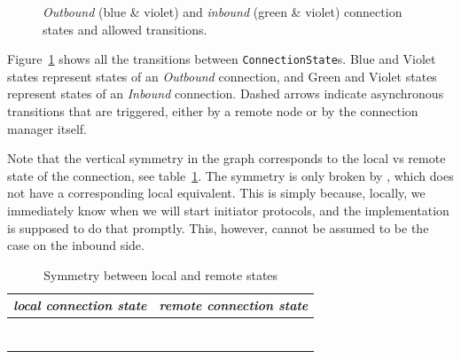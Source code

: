 \begin{figure}[p]
{}
  \caption{\textit{Outbound} (blue \& violet) and \textit{inbound} (green \&
  violet) connection states and allowed transitions.}
  \label{fig:statediagram}
\end{figure}

Figure~\ref{fig:statediagram} shows all the transitions between
\texttt{ConnectionState}s. Blue and Violet states represent states of
an \textit{Outbound} connection, and Green and Violet states represent states of an
\textit{Inbound} connection. Dashed arrows indicate asynchronous
transitions that are triggered, either by a remote node or by the connection
manager itself.

Note that the vertical symmetry in the graph corresponds to the local vs remote
state of the connection, see table~\ref{table:symmetry}. The symmetry is only
broken by \InboundIdleStateAny{}, which does not have a corresponding
local equivalent. This is simply because, locally, we immediately know when we
will start initiator protocols, and the implementation is supposed to do that
promptly. This, however, cannot be assumed to be the case on the inbound side.

\begin{table}[h]
  \begin{tabular}[h]{l|l}
    \textit{local connection state} & \textit{remote connection state} \\ [0.3em]
    \hline \\
    \UnnegotiatedStateOut{}         & \UnnegotiatedStateIn{}           \\ [0.2em]
    \OutboundIdleStateAny{}         & \InboundIdleStateAny{}           \\ [0.2em]
    \OutboundStateAny{}             & \InboundStateAny{}               \\ [0.2em]
    \OutboundStateAnyTau{}          & \InboundStateAny{}               \\ [0.2em]
    \InboundStateAny{}              & \OutboundStateAny{}              \\ [0.2em]
    \DuplexState{}                  & \DuplexState{}                   \\ [0.2em]
  \end{tabular}
  \caption{Symmetry between local and remote states}
  \label{table:symmetry}
\end{table}

